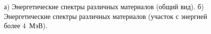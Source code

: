 \documentclass[a4paper]{panl}
\begin{document}
\begin{figure}[t]
    \begin{center}
        \begin{minipage}[h]{0.49\linewidth}
        \end{minipage}
        \hfill
        \begin{minipage}[h]{0.49\linewidth}
        \end{minipage} 
        \caption{а) Энергетические спектры различных материалов (общий вид).
        б) Энергетические спектры различных материалов (участок с энергией более 4~МэВ).}
    \end{center}
    \vspace{-5mm}
\end{figure}
\end{document}
